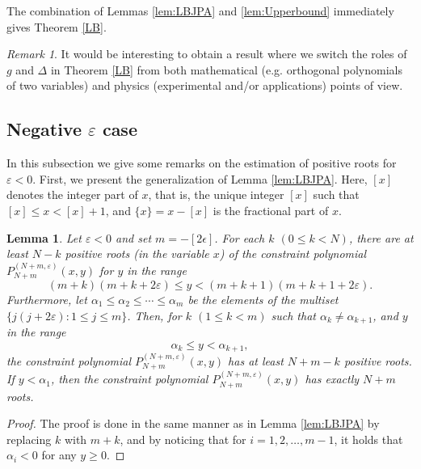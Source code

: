 \documentclass[11pt]{article}
\numberwithin{equation}{section}
\newcommand{\e}{\varepsilon}
\newcommand{\cp}[2]{P^{(#1)}_{#2}} %
\newcommand{\floor}[1]{[#1]}
\newcommand{\fract}[1]{\{#1\}}
\theoremstyle{plain}
\newtheorem{lem}[thm]{Lemma}
\theoremstyle{definition}
\theoremstyle{remark}
\newtheorem{rem}{Remark}[section]
\begin{document}
The combination of Lemmas \ref{lem:LBJPA} and \ref{lem:Upperbound} immediately gives Theorem \ref{LB}.

\begin{rem}
  It would be interesting to obtain a result where we switch the roles of $g$ and $\Delta$ in Theorem \ref{LB}
  from both mathematical (e.g. orthogonal polynomials of two variables) and physics (experimental and/or applications) points of view.
\end{rem}

\subsection{Negative \texorpdfstring{$\e$}{epsilon} case}

In this subsection we give some remarks on the estimation of positive roots for \(\e < 0\). First, we present the generalization
of Lemma \ref{lem:LBJPA}. Here, \(\floor{x}\) denotes the integer part of \(x\), that is, the unique integer \(\floor{x}\) such
that \( \floor{x} \leq x < \floor{x} + 1 \), and \(\fract{x} = x - \floor{x}\) is the fractional part of \(x\).

\begin{lem}
  \label{lem:LBJPAneg}
  Let \( \e < 0\) and set \(m = - \floor{2\epsilon} \). For each \(k\) \((0\leq k <N)\), there are at least $N-k$ positive roots
  (in the variable $x$) of the constraint polynomial \(\cp{N+m,\e}{N+m}(x,y)\) for $y$ in the range
  \begin{equation*}
     (m+k)(m+k+2\e) \leq y < (m+k+1)(m+k+1 +2\e).
   \end{equation*}
   Furthermore, let \(\alpha_1 \le \alpha_2 \leq \cdots \leq \alpha_m \) be the elements of the multiset \(\{ j(j+2 \e) :  1 \leq j \leq m \}\).
   Then, for \(k\) \((1 \leq k < m)\) such that \(\alpha_k \not= \alpha_{k+1}\), and \(y\) in the range
   \begin{equation*}
     \alpha_k \leq y < \alpha_{k+1},
   \end{equation*}
   the constraint polynomial \(\cp{N+m,\e}{N+m}(x,y)\) has at least
   \(N+m - k\) positive roots. If \( y < \alpha_1\), then the constraint
   polynomial \(\cp{N+m,\e}{N+m}(x,y)\) has exactly \(N+m\) roots.
\end{lem}

\begin{proof}
  The proof is done in the same manner as in Lemma \ref{lem:LBJPA} by
  replacing \(k\) with \(m+k\), and by noticing that for \(i=1,2,\ldots, m-1\),
  it holds that  \(\alpha_i <0 \) for any \(y \geq 0\). 
\end{proof}
\end{document}
